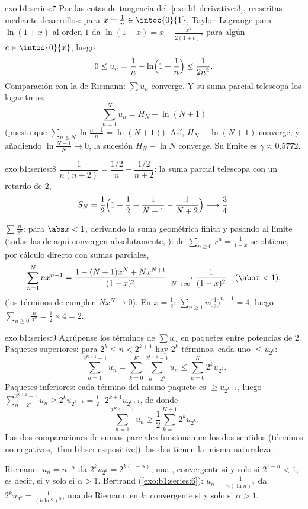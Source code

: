 \begin{solution}{exo:b1:series:7}
Por las cotas de tangencia del~\cref{exo:b1:derivative:3}, reescritas
mediante desarrollos: para $x = \frac1n \in \intoc{0}{1}$,
Taylor--Lagrange para $\ln(1+x)$ al orden $1$ da
$\ln(1 + x) = x - \frac{x^2}{2(1 + c)^2}$ para algún
$c \in \intoo{0}{x}$, luego
\[
0 \leq u_n = \frac1n - \ln\Bigl(1 + \frac1n\Bigr) \leq
\frac{1}{2n^2} .
\]
Comparación con la  de Riemann: $\sum u_n$ converge. Y su suma
parcial telescopa los logaritmos:
\[
\sum_{n=1}^{N} u_n = H_N - \ln(N+1)
\]
(puesto que $\sum_{n\leq N} \ln\frac{n+1}{n} = \ln(N+1)$). Así,
$H_N - \ln(N+1)$ converge; y añadiendo $\ln\frac{N+1}{N} \to 0$, la
sucesión $H_N - \ln N$ converge. Su límite es $\gamma \approx 0.5772$.
\end{solution}

\begin{solution}{exo:b1:series:8}
$\dfrac{1}{n(n+2)} = \dfrac{1/2}{n} - \dfrac{1/2}{n+2}$: la suma
parcial telescopa con un retardo de $2$,
\[
S_N = \frac12\Bigl(1 + \frac12 - \frac{1}{N+1} -
\frac{1}{N+2}\Bigr) \longrightarrow \frac34 .
\]

$\sum \frac{n}{2^n}$: para $\abs x < 1$, derivando la suma geométrica
finita y pasando al límite (todas las  de aquí convergen
absolutamente, ): de
$\sum_{n\geq0} x^n = \frac{1}{1-x}$ se obtiene, por cálculo directo
con sumas parciales,
\[
\sum_{n=1}^{N} n x^{n-1}
= \frac{1 - (N+1)x^N + N x^{N+1}}{(1 - x)^2}
\xrightarrow[N\to\infty]{} \frac{1}{(1-x)^2}
\quad (\abs x < 1),
\]
(los términos de  cumplen $N x^N \to 0$). En $x = \frac12$:
$\sum_{n\geq1} n\bigl(\frac12\bigr)^{n-1} = 4$, luego
$\sum_{n\geq0} \frac{n}{2^n} = \frac12 \times 4 = 2$.
\end{solution}

\begin{solution}{exo:b1:series:9}
Agrúpense los términos de $\sum u_n$ en paquetes entre potencias de
$2$. Paquetes superiores: para $2^k \leq n < 2^{k+1}$ hay $2^k$
términos, cada uno $\leq u_{2^k}$:
\[
\sum_{n=1}^{2^{K+1}-1} u_n
= \sum_{k=0}^{K} \sum_{n=2^k}^{2^{k+1}-1} u_n
\leq \sum_{k=0}^{K} 2^k u_{2^k} .
\]
Paquetes inferiores: cada término del mismo paquete es
$\geq u_{2^{k+1}}$, luego
$\sum_{n=2^k}^{2^{k+1}-1} u_n \geq 2^k u_{2^{k+1}} = \frac12
\cdot 2^{k+1} u_{2^{k+1}}$, de donde
\[
\sum_{n=1}^{2^{K+1}-1} u_n \geq \frac12 \sum_{k=1}^{K+1} 2^{k}
u_{2^{k}} .
\]
Las dos comparaciones de sumas parciales funcionan en los dos
sentidos (términos no negativos, \cref{thm:b1:series:positive}): las
dos  tienen la misma naturaleza.

Riemann: $u_n = n^{-\alpha}$ da $2^k u_{2^k} = 2^{k(1-\alpha)}$, una
, convergente si y solo si $2^{1 - \alpha} < 1$, es
decir, si y solo si $\alpha > 1$. Bertrand
(\cref{exo:b1:series:6}): $u_n = \frac{1}{n(\ln n)^\alpha}$ da
$2^k u_{2^k} = \frac{1}{(k\ln 2)^\alpha}$, una  de Riemann en
$k$: convergente si y solo si $\alpha > 1$.
\end{solution}

